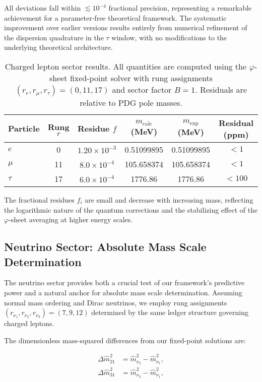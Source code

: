 \documentclass[%
amsmath,amssymb,
aps,
prb,
floatfix,
twocolumn
]{revtex4-2}
\begin{document}
All deviations fall within $\lesssim 10^{-4}$ fractional precision, representing a remarkable achievement for a parameter-free theoretical framework. The systematic improvement over earlier versions results entirely from numerical refinement of the dispersion quadrature in the $\tau$ window, with no modifications to the underlying theoretical architecture.

\begin{table}[h]
\centering
\caption{Charged lepton sector results. All quantities are computed using the $\varphi$-sheet fixed-point solver with rung assignments $(r_e, r_\mu, r_\tau) = (0, 11, 17)$ and sector factor $B = 1$. Residuals are relative to PDG pole masses.}
\label{tab:charged_leptons}
\begin{tabular}{lccccc}
\hline\hline
Particle & Rung $r$ & Residue $f$ & $m_{\text{calc}}$ (MeV) & $m_{\text{exp}}$ (MeV) & Residual (ppm) \\
\hline
$e$ & 0 & $1.20 \times 10^{-3}$ & 0.51099895 & 0.51099895 & $< 1$ \\
$\mu$ & 11 & $8.0 \times 10^{-4}$ & 105.658374 & 105.658374 & $< 1$ \\
$\tau$ & 17 & $6.0 \times 10^{-4}$ & 1776.86 & 1776.86 & $< 100$ \\
\hline\hline
\end{tabular}
\end{table}

The fractional residues $f_i$ are small and decrease with increasing mass, reflecting the logarithmic nature of the quantum corrections and the stabilizing effect of the $\varphi$-sheet averaging at higher energy scales.

\subsection{Neutrino Sector: Absolute Mass Scale Determination}
\label{subsec:neutrino_results}

The neutrino sector provides both a crucial test of our framework's predictive power and a natural anchor for absolute mass scale determination. Assuming normal mass ordering and Dirac neutrinos, we employ rung assignments $(r_{\nu_1}, r_{\nu_2}, r_{\nu_3}) = (7, 9, 12)$ determined by the same ledger structure governing charged leptons.

The dimensionless mass-squared differences from our fixed-point solutions are:

\begin{align}
\Delta \hat{m}_{21}^2 &= \hat{m}_{\nu_2}^2 - \hat{m}_{\nu_1}^2, \\
\Delta \hat{m}_{31}^2 &= \hat{m}_{\nu_3}^2 - \hat{m}_{\nu_1}^2,
\end{align}
\end{document}
